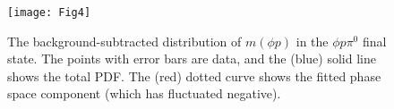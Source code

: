 \documentclass[aps,prl,twocolumn,superscriptaddress,showpacs,preprintnumbers,amsmath,amssymb]{revtex4-1}
\begin{document}

\begin{figure}[htb]
\centering
\texttt{[image: Fig4]}
\caption{\small   The background-subtracted distribution of $m(\phi p)$ in the $\phi p\pi^0$ final state. The points with error bars are data, and   the (blue) solid line shows the total PDF. The (red) dotted curve shows the fitted phase space component (which has fluctuated negative).}
\label{fig:bkg-sub_dis}
\end{figure}
\end{document}
